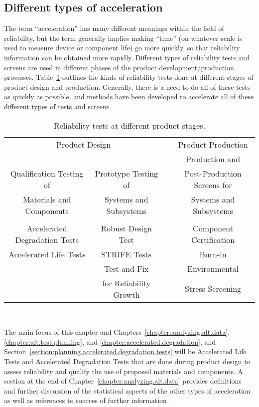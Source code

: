 \subsection{Different types of acceleration}
The term ``acceleration'' has many different meanings within the
field of reliability, but the term generally implies making ``time''
(on whatever scale is used to measure device or component life)
go more quickly, so that reliability information can be obtained more rapidly.
Different types of reliability tests and screens 
are used in different phases of
the product development/production processes.
Table~\ref{table:different.ats} outlines the kinds of reliability
tests done at different stages of product design and production.
Generally, there is a need to do all of these tests as quickly as
possible, and methods have been developed to accelerate all of
these different types of tests and screens.
\begin{table}
\caption{Reliability tests at different product stages.}
\centering\small
\begin{tabular} {cccc}
\\[-.5ex]
\multicolumn{2}{c}{Product Design} & & Product Production\\[.5ex]
\cline{1-2} \cline{4-4}
&&& Production and \\
Qualification Testing of & Prototype Testing of && Post-Production
Screens for \\ 
Materials and Components & Systems and Subsystems && Systems and Subsystems \\[.2ex] 
\hline 
\\[-.5ex]
Accelerated Degradation Tests& Robust Design Test &&  Component Certification \\[1ex] 
Accelerated Life Tests  & STRIFE Tests & &   Burn-in	\\ [1ex]
	& Test-and-Fix && Environmental  \\
		& for Reliability Growth &&		Stress Screening\\ 
\hline
\end{tabular} \\ 
\begin{minipage}[t]{4in}
\end{minipage}
\label{table:different.ats}
\end{table}
The main focus of this chapter and Chapters~\ref{chapter:analyzing.alt.data},
\ref{chapter:alt.test.planning}, and \ref{chapter:accelerated.degradation},
and Section~\ref{section:planning.accelerated.degradation.tests}
will be Accelerated Life Tests and Accelerated Degradation Tests
that are done during product design to assess reliability and
qualify the use of proposed materials and components.  A section at
the end of Chapter~\ref{chapter:analyzing.alt.data} provides
definitions and further discussion of the statistical aspects of the
other types of acceleration as well as references to sources of
further information .
